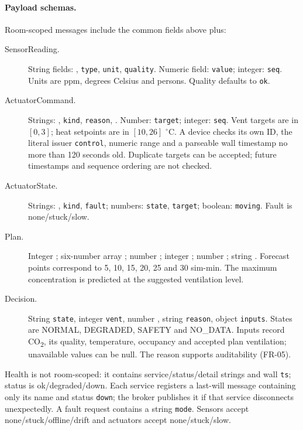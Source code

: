\documentclass[11pt,a4paper]{article}
\begin{document}
\paragraph{Payload schemas.}
Room-scoped messages include the common fields above plus:
\begin{description}
\item[SensorReading.] String fields: \protect{}, \texttt{type}, \texttt{unit}, \texttt{quality}. Numeric field: \texttt{value}; integer: \texttt{seq}. Units are ppm, degrees Celsius and persons. Quality defaults to \texttt{ok}.
\item[ActuatorCommand.] Strings: \protect{}, \texttt{kind}, \texttt{reason}, \protect{}. Number: \texttt{target}; integer: \texttt{seq}. Vent targets are in $[0,3]$; heat setpoints are in $[10,26]$ $^\circ$C. A device checks its own ID, the literal issuer \texttt{control}, numeric range and a parseable wall timestamp no more than 120 seconds old. Duplicate targets can be accepted; future timestamps and sequence ordering are not checked.
\item[ActuatorState.] Strings: \protect{}, \texttt{kind}, \texttt{fault}; numbers: \texttt{state}, \texttt{target}; boolean: \texttt{moving}. Fault is none/stuck/slow.
\item[Plan.] Integer \protect{}; six-number array \protect{}; number \protect{}; integer \protect{}; number \protect{}; string \protect{}. Forecast points correspond to 5, 10, 15, 20, 25 and 30 sim-min. The maximum concentration is predicted at the suggested ventilation level.
\item[Decision.] String \texttt{state}, integer \texttt{vent}, number \protect{}, string \texttt{reason}, object \texttt{inputs}. States are NORMAL, DEGRADED, SAFETY and NO\_DATA. Inputs record CO\textsubscript{2}, its quality, temperature, occupancy and accepted plan ventilation; unavailable values can be null. The reason supports auditability (FR-05).
\end{description}
Health is not room-scoped: it contains service/status/detail strings and wall \texttt{ts}; status is ok/degraded/down. Each service registers a last-will message containing only its name and status \texttt{down}; the broker publishes it if that service disconnects unexpectedly. A fault request contains a string \texttt{mode}. Sensors accept none/stuck/offline/drift and actuators accept none/stuck/slow.
\end{document}
